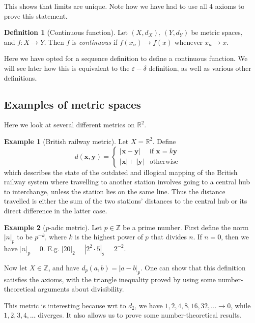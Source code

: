 \documentclass[a4paper,11pt]{article}
\theoremstyle{definition}
\newtheorem*{defn}{Definition}
\newtheorem*{ex}{Example}
\numberwithin{equation}{section}
\begin{document}
This shows that limits are unique. Note how we have had to use all 4 axioms to prove this statement.

\begin{defn}[Continuous function]
Let $(X,d_X)$, $(Y,d_Y)$ be metric spaces, and $f:X\rightarrow Y$. Then $f$ is \emph{continuous} if $f(x_n)\rightarrow f(x)$ whenever $x_n\rightarrow x$.
\end{defn}

Here we have opted for a sequence definition to define a continuous function. We will see later how this is equivalent to the $\varepsilon-\delta$ definition, as well as various other definitions.

\subsection{Examples of metric spaces}
Here we look at several different metrics on $\mathbb{R}^2$.
\begin{ex}[British railway metric]
Let $X=\mathbb{R}^2$. Define 
\[
    d(\mathbf{x},\mathbf{y}) = \left\{\begin{array}{lr}
        |\mathbf{x} - \mathbf{y}| & \text{if }\mathbf{x}=k\mathbf{y} \\
        |\mathbf{x}|+|\mathbf{y}| & \text{otherwise}
    \end{array}\right.
\]
which describes the state of the outdated and illogical mapping of the British railway system where travelling to another station involves going to a central hub to interchange, unless the station lies on the same line. Thus the distance travelled is either the sum of the two stations' distances to the central hub or its direct difference in the latter case.
\end{ex}

\begin{ex}[$p$-adic metric]
Let $p\in\mathbb{Z}$ be a prime number. First define the norm $|n|_p$ to be $p^{-k}$, where $k$ is the highest power of $p$ that divides $n$. If $n=0$, then we have $|n|_p =0$. E.g. $|20|_2 = |2^2\cdot 5|_2=2^{-2}$.

Now let $X\in\mathbb{Z}$, and have $d_p(a,b) = |a-b|_p$. One can show that this definition satisfies the axioms, with the triangle inequality proved by using some number-theoretical arguments about divisibility.

This metric is interesting because wrt to $d_2$, we have $1,2,4,8,16,32,...\rightarrow 0$, while $1,2,3,4,...$ diverges. 
It also allows us to prove some number-theoretical results.
\end{ex}
\end{document}
